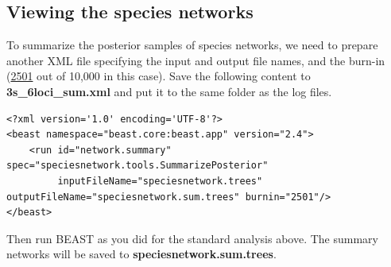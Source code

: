 \documentclass[11pt]{article}
\begin{document}
\subsection*{Viewing the species networks}

To summarize the posterior samples of species networks, we need to prepare another XML file specifying the input and output file names, and the burn-in (\underline{2501} out of 10,000 in this case). Save the following content to \textbf{3s\_6loci\_sum.xml} and put it to the same folder as the log files.

{\tiny
\begin{verbatim}
<?xml version='1.0' encoding='UTF-8'?>
<beast namespace="beast.core:beast.app" version="2.4">
    <run id="network.summary" spec="speciesnetwork.tools.SummarizePosterior"
         inputFileName="speciesnetwork.trees" outputFileName="speciesnetwork.sum.trees" burnin="2501"/>
</beast>
\end{verbatim}}

\noindent Then run BEAST as you did for the standard analysis above. The summary networks will be saved to \textbf{speciesnetwork.sum.trees}.





\end{document}
